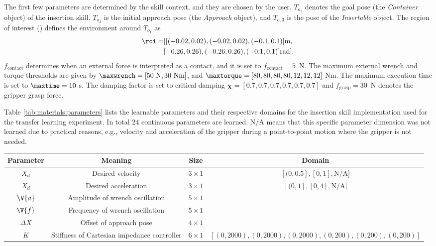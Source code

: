 The first few parameters are determined by the skill context, and they are chosen by the user.
$T_{o_1}$ denotes the goal pose (the \textit{Container} object) of the insertion skill, $T_{o_2}$ is the initial approach pose (the \textit{Approach} object), and $T_{o,3}$ is the pose of the \textit{Insertable} object.
The region of interest (\roi) defines the environment around $T_{o_1}$ as
\begin{align*}
 \text{\roi}=&[[(-0.02,0.02),(-0.02,0.02),(-0.1,0.1)] \text{m},\\
 &[-0.26,0.26),(-0.26,0.26),(-0.1,0.1)] \text{rad}].
\end{align*}
$f_\text{contact}$ determines when an external force is interpreted as a contact, and it is set to $f_\text{contact}=5$~N.
The maximum external wrench and torque thresholds are given by $\maxwrench=[50 \text{ N}, 30 \text{ Nm}]$, and $\maxtorque=[80,80,80,80,12,12,12]$ Nm.
The maximum execution time is set to $\maxtime=10$ s.
The damping factor is set to critical damping $\boldsymbol{\chi}=[0.7,0.7,0.7,0.7,0.7,0.7]$ and $f_\text{grasp} = 30$~N denotes the gripper grasp force.

Table \ref{tab:materials:parameters} lists the learnable parameters and their respective domains for the insertion skill implementation used for the transfer learning experiment.
In total $24$ continuous parameters are learned.
N/A means that this specific parameter dimension was not learned due to practical reasons, e.g., velocity and acceleration of the gripper during a point-to-point motion where the gripper is not needed.

\begin{table*}[ht!]
    \centering
    \caption{Learnable parameters for the insertion skill}
    \label{tab:materials:parameters}
    \begin{tabular}{|c|c|c|c|}
    \hline
    Parameter & Meaning & Size & Domain \\
    \hline
        $\dot{X}_d$ & Desired velocity & $3\times1$ & $[(0,0.5],[0,1],\text{N/A}]$ \\
        \hline
        $\ddot{X}_d$ & Desired acceleration & $3\times1$ & $[(0,1],[0,4],\text{N/A}]$ \\
        \hline
        $\V{a}$ & Amplitude of wrench oscillation & $5\times1$ & \\
        \hline
        $\V{f}$ & Frequency of wrench oscillation & $5\times1$ & \\
        \hline
        $\Delta X$ & Offset of approach pose & $4\times1$ & \\
        \hline
        $K$ & Stiffness of Cartesian impedance controller & $6\times1$ & $[(0,2000),(0,2000),(0,2000),(0,200),(0,200),(0,200)]$ \\
        \hline
    \end{tabular}
\end{table*}